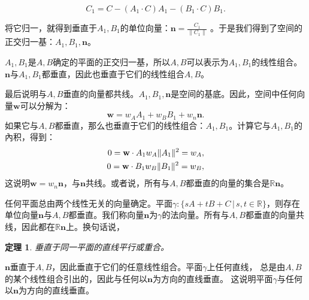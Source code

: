 \documentclass[12pt,UTF8]{ctexbook}
\newtheorem{tm}{定理}[section]
\begin{document}
\begin{proof2}
$$C_1 = C - (A_1\cdot C)A_1 - (B_1\cdot C)B_1.$$

将它归一，就得到垂直于$A_1,B_1$的单位向量：$\mathbf{n} = \frac{C_1}{\|C_1\|}$ 。于是我们得到了空间的正交归一基：$A_1,B_1,\mathbf{n}$。

$A_1,B_1$是$A,B$确定的平面的正交归一基，所以$A,B$可以表示为$A_1,B_1$的线性组合。$\mathbf{n}$与$A_1,B_1$都垂直，因此也垂直于它们的线性组合$A,B$。

最后说明与$A,B$垂直的向量都共线。$A_1,B_1,\mathbf{n}$是空间的基底。因此，空间中任何向量$\mathbf{w}$可以分解为：
$$
\mathbf{w} = w_A A_1 + w_B B_1 + w_n \mathbf{n}.
$$
如果它与$A,B$都垂直，那么也垂直于它们的线性组合：$A_1,B_1$。计算它与$A_1,B_1$的內积，得到：
\begin{align}
0 = \mathbf{w}\cdot A_1  w_A\|A_1\|^2 = w_A, \notag \\
0 = \mathbf{w}\cdot B_1  w_B\|B_1\|^2 = w_B, \notag \\
\end{align}
这说明$\mathbf{w} = w_n \mathbf{n}$，与$\mathbf{n}$共线。或者说，所有与$A,B$都垂直的向量的集合是$\mathbb{R}\mathbf{n}$。
\end{proof2}
任何平面总由两个线性无关的向量确定。平面$\gamma : \{sA + tB + C \, | \, s, t\in\mathbb{R}\}$，则存在单位向量$\mathbf{n}$与$A,B$都垂直。我们称向量$\mathbf{n}$为$\gamma$的法向量。所有与$A,B$都垂直的向量共线，因此都在$\mathbb{R}\mathbf{n}$上。换句话说，
\begin{tm}
    垂直于同一平面的直线平行或重合。
\end{tm}
$\mathbf{n}$垂直于$A,B$，因此垂直于它们的任意线性组合。平面$\gamma$上任何直线，
总是由$A,B$的某个线性组合引出的，因此与任何以$\mathbf{n}$为方向的直线垂直。
这说明平面$\gamma$与任何以$\mathbf{n}$为方向的直线垂直。
\end{document}
